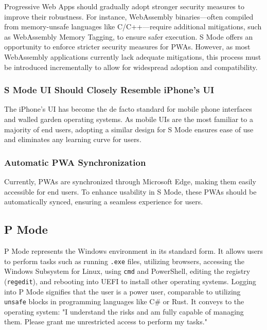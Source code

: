 Progressive Web Apps should gradually adopt stronger security measures to improve their robustness. For instance, WebAssembly binaries—often compiled from memory-unsafe languages like C/C++—require additional mitigations, such as WebAssembly Memory Tagging\cite{webassemblymemorytagging}, to ensure safer execution. S Mode offers an opportunity to enforce stricter security measures for PWAs. However, as most WebAssembly applications currently lack adequate mitigations, this process must be introduced incrementally to allow for widespread adoption and compatibility.

\subsubsection{S Mode UI Should Closely Resemble iPhone's UI}

The iPhone's UI has become the de facto standard for mobile phone interfaces and walled garden operating systems. As mobile UIs are the most familiar to a majority of end users, adopting a similar design for S Mode ensures ease of use and eliminates any learning curve for users. 

\subsubsection{Automatic PWA Synchronization}

Currently, PWAs are synchronized through Microsoft Edge, making them easily accessible for end users. To enhance usability in S Mode, these PWAs should be automatically synced, ensuring a seamless experience for users.

\subsection{P Mode}

P Mode represents the Windows environment in its standard form. It allows users to perform tasks such as running \texttt{.exe} files, utilizing browsers, accessing the Windows Subsystem for Linux, using \texttt{cmd} and PowerShell, editing the registry (\texttt{regedit}), and rebooting into UEFI to install other operating systems. Logging into P Mode signifies that the user is a power user, comparable to utilizing \texttt{unsafe} blocks in programming languages like C\# or Rust. It conveys to the operating system: "I understand the risks and am fully capable of managing them. Please grant me unrestricted access to perform my tasks."


